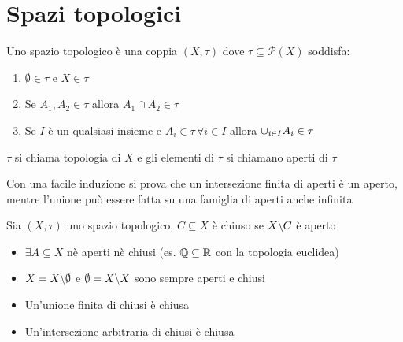 \section{Spazi topologici}
\begin{defn}\bianco
Uno spazio topologico \`e una coppia $(X,\tau)$ dove $
\tau \subseteq \mathcal{P}(X)$ soddisfa:
\begin{enumerate}
	\item $\emptyset \in \tau $ e $X\in \tau$
	\item Se $A_1,A_2 \in \tau$ allora $A_1\cap A_2\in \tau$
	\item Se $I$ \`e un qualsiasi insieme e $A_i\in \tau\, \forall i\in I $ allora $\displaystyle \cup_{i\in I} A_i \in \tau $
\end{enumerate}	
$\tau$ si chiama topologia di $X$ e gli elementi di $\tau$ si chiamano aperti di $\tau$

\begin{oss}
Con una facile induzione si prova che un intersezione finita di aperti \`e un aperto, mentre l'unione pu\`o essere fatta su una famiglia di aperti anche infinita	
\end{oss}
\end{defn}
\begin{defn}[Chiuso]\bianco
Sia $(X,\tau)$ uno spazio topologico, $C\subseteq X$ \`e chiuso se $X \backslash C$ \`e aperto 	
\end{defn}
\begin{fatti}
	\begin{itemize}
		\item $\exists A \subseteq X $ n\`e aperti n\`e chiusi (es. $\mathbb{Q}\subseteq \mathbb{R} $ con la topologia euclidea)
		\item $X=X\backslash \emptyset $ e $ \emptyset=X\backslash X$ sono sempre aperti e chiusi
		\item Un'unione finita di chiusi \`e chiusa
		\item Un'intersezione arbitraria di chiusi \`e chiusa
	\end{itemize}
\end{fatti}
\spazio
